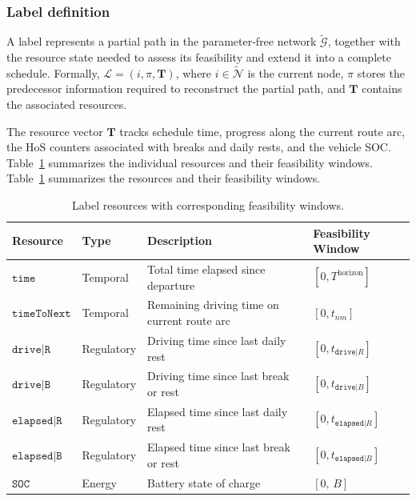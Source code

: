 \documentclass[3p,11pt,authoryear]{elsarticle}  %
\begin{document}
\subsubsection{Label definition}

A label represents a partial path in the parameter-free network \(\mathcal{\widetilde{G}}\), together with the resource state needed to assess its feasibility and extend it into a complete schedule. Formally, $\mathcal{L}=(i,\pi,\mathbf{T})$,
where \(i\in\mathcal{\widetilde{N}}\) is the current node, \(\pi\) stores the predecessor information required to reconstruct the partial path, and \(\mathbf{T}\) contains the associated resources.

The resource vector $\mathbf{T}$ tracks schedule time, progress along the current route arc, the HoS counters associated with breaks and daily rests, and
the vehicle SOC. Table~\ref{tab:resource_windows_partial} summarizes the
individual resources and their feasibility windows.
Table~\ref{tab:resource_windows_partial} summarizes the resources and their feasibility windows.




\begin{table}[!htbp]
\centering
\caption{Label resources with corresponding feasibility windows.}
\label{tab:resource_windows_partial}
\begin{tabular}{@{}llll@{}}
\toprule
\textbf{Resource} & \textbf{Type} & \textbf{Description} & \textbf{Feasibility Window} \\
\midrule
$\texttt{time}$ & Temporal & Total time elapsed since departure & $[0,T^{\text{horizon}}]$ \\
$\texttt{timeToNext}$ & Temporal &  Remaining driving time on current route arc & $[0,t_{nm}]$ \\
$\texttt{drive|R}$ & Regulatory & Driving time since last daily rest & $[0,t_{\texttt{drive}|R}]$ \\
$\texttt{drive|B}$ & Regulatory & Driving time since last break or rest & $[0,t_{\texttt{drive}|B}]$ \\
$\texttt{elapsed|R}$ & Regulatory & Elapsed time since last daily rest & $[0,t_{\texttt{elapsed}|R}]$ \\
$\texttt{elapsed|B}$ &  Regulatory & Elapsed time since last break or rest & $[0,t_{\texttt{elapsed}|B}]$ \\
$\texttt{SOC}$ & Energy & Battery state of charge
  & $[0,\,B]$ \\
\bottomrule
\end{tabular}
\end{table}
\end{document}
